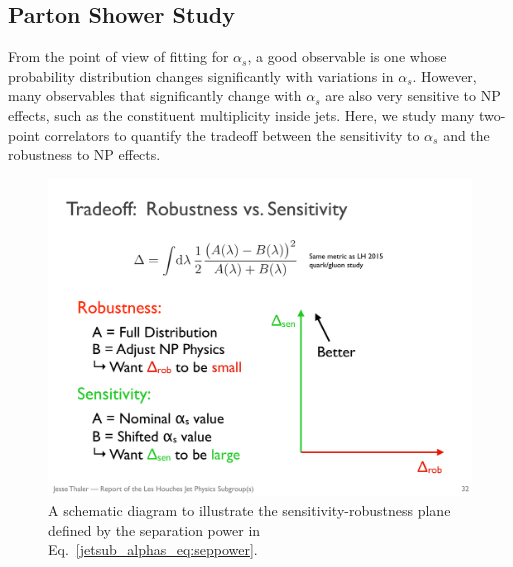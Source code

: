 \documentclass[11pt]{cernrep}
\begin{document}
\subsection{Parton Shower Study}


From the point of view of fitting for $\alpha_s$, a good observable is one whose probability distribution changes significantly with variations in $\alpha_s$.
%
However, many observables that significantly change with $\alpha_s$ are also very sensitive to NP effects, such as the constituent multiplicity inside jets.
%
Here, we study many two-point correlators to quantify the tradeoff between the sensitivity to $\alpha_s$ and the robustness to NP effects.

\begin{figure}[t]
\begin{center}
\includegraphics[width = 0.4\columnwidth]{jetsub_alphas_robustnessschematic.pdf}
\end{center}
\caption{A schematic diagram to illustrate the sensitivity-robustness plane defined by the separation power in Eq.~\ref{jetsub_alphas_eq:seppower}.}
\label{jetsub_alphas_fig:robustnessschematic}
\end{figure}
\end{document}
